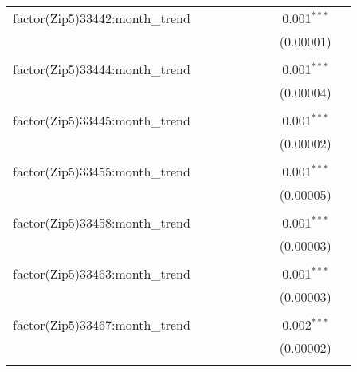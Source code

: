 \begin{table}[H]
{\begin{tabular}{@{\extracolsep{5pt}}lcccccccc}
  factor(Zip5)33442:month\_trend &  &  &  &  &  &  & 0.001$^{***}$ &  \\  

   &  &  &  &  &  &  & (0.00001) &  \\  

   & & & & & & & & \\  

  factor(Zip5)33444:month\_trend &  &  &  &  &  &  & 0.001$^{***}$ &  \\  

   &  &  &  &  &  &  & (0.00004) &  \\  

   & & & & & & & & \\  

  factor(Zip5)33445:month\_trend &  &  &  &  &  &  & 0.001$^{***}$ &  \\  

   &  &  &  &  &  &  & (0.00002) &  \\  

   & & & & & & & & \\  

  factor(Zip5)33455:month\_trend &  &  &  &  &  &  & 0.001$^{***}$ &  \\  

   &  &  &  &  &  &  & (0.00005) &  \\  

   & & & & & & & & \\  

  factor(Zip5)33458:month\_trend &  &  &  &  &  &  & 0.001$^{***}$ &  \\  

   &  &  &  &  &  &  & (0.00003) &  \\  

   & & & & & & & & \\  

  factor(Zip5)33463:month\_trend &  &  &  &  &  &  & 0.001$^{***}$ &  \\  

   &  &  &  &  &  &  & (0.00003) &  \\  

   & & & & & & & & \\  

  factor(Zip5)33467:month\_trend &  &  &  &  &  &  & 0.002$^{***}$ &  \\  

   &  &  &  &  &  &  & (0.00002) &  \\  

   & & & & & & & & \\  


\end{tabular}}
\end{table}
